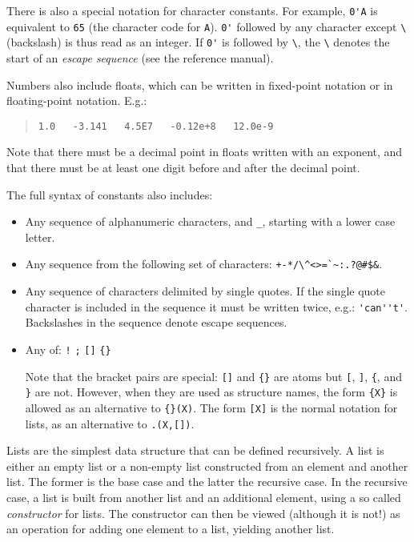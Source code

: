 There is also a special notation for character constants. For example,
\verb+0'A+
is equivalent to \verb+65+ (the character code for \verb+A+).
\verb+0'+ followed by any character except \verb+\+ (backslash) is thus
read as an integer.  If \verb+0'+ is followed by \verb+\+, the \verb+\+
denotes the start of an {\em escape sequence} (see the reference manual).

Numbers also include floats, which can be written in fixed-point
notation or in floating-point notation. E.g.:
\begin{quote}
\begin{verbatim}
1.0   -3.141   4.5E7   -0.12e+8   12.0e-9
\end{verbatim}
\end{quote}

Note that there must be a decimal point in floats written with an exponent,
and that there must be at least one digit before and after the decimal point.

The full syntax of constants also includes:
\begin{itemize}
\item
Any  sequence  of  alphanumeric characters, and \verb+_+, starting
with a lower case letter.

\item
Any sequence from the following set of characters:
\verb/+-*/\verb+/+\verb+\^<>=`~:.?@#$&+.

\item
Any sequence of characters delimited by single quotes.  If the single
quote character is included in the sequence it must be written twice,
e.g.: \verb+'can''t'+.  Backslashes in the sequence denote escape
sequences.

\item
Any of: \verb+!+ \verb+;+ \verb+[]+ \verb+{}+

Note that the bracket pairs are special: \verb+[]+ and \verb+{}+ are
atoms but \verb+[+, \verb+]+, \verb+{+, and \verb+}+ are not.  However,
when they are used as structure names, the form \verb+{X}+
is allowed as an alternative to \verb+{}(X)+.  The form
\verb+[X]+ is the normal notation for lists, as an alternative to
\verb+.(X,[])+.
\end{itemize}

Lists are the simplest data structure that can be defined
recursively. A list is either an empty list or a non-empty list
constructed from an element and another list. The former is the base case
and the latter the recursive case. In the recursive case, a list is
built from another list and an additional element, using a so called
{\em constructor} for lists. The constructor can then be viewed
(although it is not!) as an operation for adding one element to a
list, yielding another list. 


